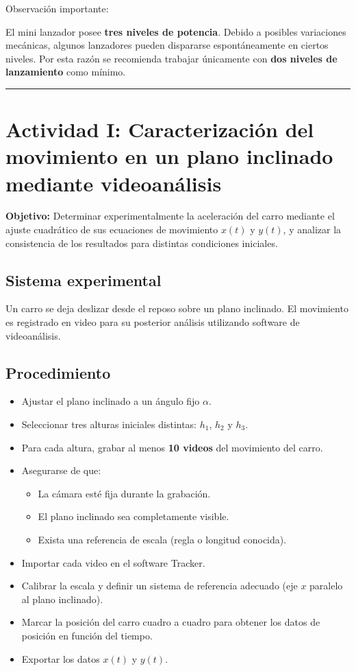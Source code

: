 Observación importante:

El mini lanzador posee \textbf{tres niveles de potencia}. Debido a posibles variaciones mecánicas, algunos lanzadores pueden dispararse espontáneamente en ciertos niveles. Por esta razón se recomienda trabajar únicamente con \textbf{dos niveles de lanzamiento} como mínimo.

\rule{\textwidth}{1pt}

\section*{Actividad I: Caracterización del movimiento en un plano inclinado mediante videoanálisis}

\textbf{Objetivo:} Determinar experimentalmente la aceleración del carro mediante el ajuste cuadrático de sus ecuaciones de movimiento $x(t)$ y $y(t)$, y analizar la consistencia de los resultados para distintas condiciones iniciales.

\subsection*{Sistema experimental}

Un carro se deja deslizar desde el reposo sobre un plano inclinado. El movimiento es registrado en video para su posterior análisis utilizando software de videoanálisis.

\subsection*{Procedimiento}

\begin{itemize}
\item Ajustar el plano inclinado a un ángulo fijo $\alpha$.
\item Seleccionar tres alturas iniciales distintas: $h_1$, $h_2$ y $h_3$.
\item Para cada altura, grabar al menos \textbf{10 videos} del movimiento del carro.
\item Asegurarse de que:
  \begin{itemize}
  \item La cámara esté fija durante la grabación.
  \item El plano inclinado sea completamente visible.
  \item Exista una referencia de escala (regla o longitud conocida).
  \end{itemize}
\item Importar cada video en el software Tracker.
\item Calibrar la escala y definir un sistema de referencia adecuado (eje $x$ paralelo al plano inclinado).
\item Marcar la posición del carro cuadro a cuadro para obtener los datos de posición en función del tiempo.
\item Exportar los datos $x(t)$ y $y(t)$.
\end{itemize}

